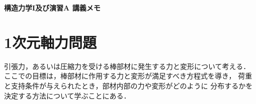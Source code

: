 \documentclass[10pt,a4j]{jarticle}
\newlength{\minitwocolumn}
\begin{document}
\newcommand{\fat}[1]{\mbox{\boldmath $#1$}}
\newcommand{\D}{\partial}
\newcommand{\w}{\omega}
\newcommand{\ga}{\alpha}
\newcommand{\gb}{\beta}
\newcommand{\gx}{\xi}
\newcommand{\gz}{\zeta}
\newcommand{\vhat}[1]{\hat{\fat{#1}}}
\newcommand{\spc}{\vspace{0.7\baselineskip}}
\newcommand{\halfspc}{\vspace{0.3\baselineskip}}

\newcommand{\twofig}[2]
 {
   \begin{figure}
     \begin{minipage}[t]{\minitwocolumn}
         \begin{center}   #1
         \end{center}
     \end{minipage}
         \hspace{\columnsep}
     \begin{minipage}[t]{\minitwocolumn}
         \begin{center} #2
         \end{center}
     \end{minipage}
   \end{figure}
 }
\begin{center}
	{\Large \bf 構造力学I及び演習A 講義メモ} \\
\end{center}
\section{1次元軸力問題}
引張力，あるいは圧縮力を受ける棒部材に発生する力と変形について考える．
ここでの目標は，棒部材に作用する力と変形が満足すべき方程式を導き，
荷重と支持条件が与えられたとき，部材内部の力や変形がどのように
分布するかを決定する方法について学ぶことにある．
\end{document}
